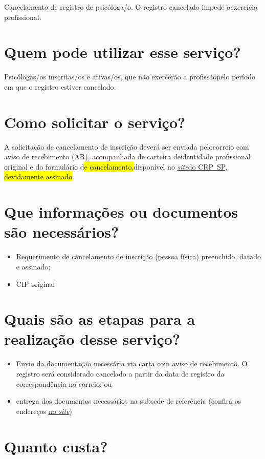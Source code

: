 Cancelamento de registro de psicóloga/o. O registro cancelado impede oexercício profissional.

\section{Quem pode utilizar esse serviço?}

Psicólogas/os inscritas/os e ativas/os, que não exercerão a profissãopelo período em que o registro estiver cancelado.

\section{Como solicitar o serviço?}

A solicitação de cancelamento de inscrição deverá ser enviada pelocorreio com aviso de recebimento (AR), acompanhada de carteira deidentidade profissional original e do formulário d\hl{e cancelamento,}disponível no \href{https://www.crpsp.org/pagina/view/312}{\emph{site}do CRP~SP}, \hl{devidamente assinado}.

\section{Que informações ou documentos são necessários?}

\begin{itemize}
  \item  \hyperref[]{Requerimento  de cancelamento de inscrição (pessoa física)} preenchido, datado e  assinado;
  \item  CIP original
\end{itemize}

\section{Quais são as etapas para a realização desse serviço?}

\begin{itemize}
  \item  Envio da documentação necessária via carta com aviso de recebimento. O  registro será considerado cancelado a partir da data de registro da  correspondência no correio; ou
  \item  entrega dos documentos necessários na subsede de referência (confira  os endereços \href{https://www.crpsp.org/sede/index}{no \emph{site}})
\end{itemize}

\section{Quanto custa?}

